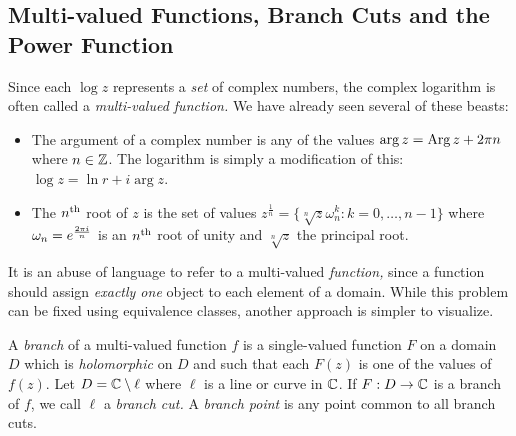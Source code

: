 \subsection[Multi-valued Functions]{Multi-valued Functions, Branch Cuts and the Power Function}\label{sec:multivalued}%

Since each $\log z$ represents a \emph{set} of complex numbers, the complex logarithm is often called a \emph{multi-valued function.} We have already seen several of these beasts:
\begin{itemize}
  \item The argument of a complex number is any of the values $\arg z=\operatorname{Arg} z+2\pi n$ where $n\in\mathbb{Z}$. The logarithm is simply a modification of this: $\log z=\ln r+i\arg z$.
  \item The $n\textsuperscript{th}$ root of $z$ is the set of values $z^{\frac 1n}=\{\sqrt[n]{z}\omega_n^k:k=0,\ldots,n-1\}$ where $\omega_n=e^{\frac{2\pi i}{n}}$ is an $n\textsuperscript{th}$ root of unity and $\sqrt[n]{z}$ the principal root.
\end{itemize}
It is an abuse of language to refer to a multi-valued \emph{function,} since a function should assign \emph{exactly one} object to each element of a domain. While this problem can be fixed using equivalence classes,
	another approach is simpler to visualize.

\begin{defn}{}{}
A \emph{branch} of a multi-valued function $f$ is a single-valued function $F$ on a domain $D$ which is \emph{holomorphic} on $D$ and such that each $F(z)$ is one of the values of $f(z)$.\smallbreak
Let $D=\mathbb{C}\setminus\ell$ where $\ell$ is a line or curve in $\mathbb{C}$. If $F:D\to\mathbb{C}$ is a branch of $f$, we call $\ell$ a \emph{branch cut.} A \emph{branch point} is any point common to all branch cuts.
\end{defn}

